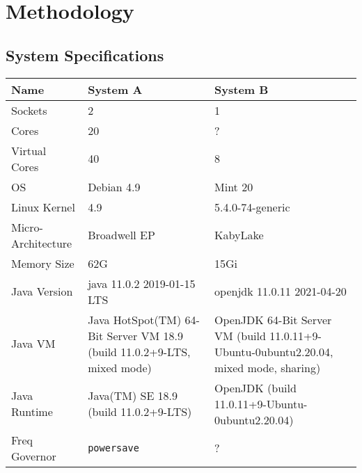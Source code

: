 \section{Methodology}

\subsection{System Specifications}



\begin{center}
 \begin{tabular}{ ||p{3cm} | p{4cm} | p{4cm} || }
 \hline
 \textbf{Name}  & \textbf{System A} & \textbf{System B}   \\
 \hline\hline
 Sockets        &   2       & 1              \\
 \hline
 Cores          & 20        & ?                 \\
 \hline
 Virtual Cores  &  40       & 8              \\
 \hline
 OS             & Debian 4.9    & Mint 20  \\
 \hline
 Linux Kernel   &  4.9          & 5.4.0-74-generic \\
 \hline
 Micro-Architecture &   Broadwell EP & KabyLake       \\
 \hline
 Memory Size    &   62G     & 15Gi  \\
 \hline
 Java Version   & java 11.0.2 2019-01-15 LTS  & openjdk 11.0.11 2021-04-20 \\
 \hline
 Java VM        & Java HotSpot(TM) 64-Bit Server VM 18.9 (build 11.0.2+9-LTS, mixed mode) & OpenJDK 64-Bit Server VM (build 11.0.11+9-Ubuntu-0ubuntu2.20.04, mixed mode, sharing) \\
 \hline
 Java Runtime   & Java(TM) SE 18.9 (build 11.0.2+9-LTS) & OpenJDK (build 11.0.11+9-Ubuntu-0ubuntu2.20.04)  \\
 \hline
 Freq Governor &   \texttt{powersave} &  ?   \\
 \hline
\end{tabular}
\end{center}


